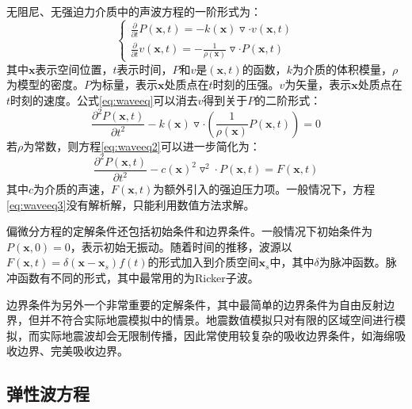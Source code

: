 无阻尼、无强迫力介质中的声波方程的一阶形式为：
\begin{equation}
\left\{\begin{matrix}
\frac{\partial}{\partial t}P(\textbf{x},t) = -k(\textbf{x}) \triangledown \cdot v(\textbf{x}, t) \\
\frac{\partial}{\partial t}v(\textbf{x},t) = -\frac{1}{\rho(\textbf{x})} \triangledown \cdot P(\textbf{x}, t)
\end{matrix}\right.
\label{eq:waveeq}
\end{equation}
其中$\textbf{x}$表示空间位置，$t$表示时间，$P$和$v$是$(\textbf{x},t)$的函数，$k$为介质的体积模量，$\rho$为模型的密度。$P$为标量，表示$\textbf{x}$处质点在$t$时刻的压强。$v$为矢量，表示$\textbf{x}$处质点在$t$时刻的速度。公式\ref{eq:waveeq}可以消去$v$得到关于$P$的二阶形式：
\begin{equation}
  \frac{\partial ^2P(\textbf{x},t)}{\partial t^2} - k(\textbf{x})\triangledown \cdot (\frac{1}{\rho(\textbf{x})}P(\textbf{x},t))=0
  \label{eq:waveeq2}
\end{equation}
若$\rho$为常数，则方程\ref{eq:waveeq2}可以进一步简化为：
\begin{equation}
    \frac{\partial ^2P(\textbf{x},t)}{\partial t^2} - c(\textbf{x})^2\triangledown ^2 \cdot P(\textbf{x},t)=F(\textbf{x}, t)
  \label{eq:waveeq3}
\end{equation}
其中$c$为介质的声速，$F(\textbf{x}, t)$为额外引入的强迫压力项。一般情况下，方程\ref{eq:waveeq3}没有解析解，只能利用数值方法求解。

偏微分方程的定解条件还包括初始条件和边界条件。一般情况下初始条件为$P(\textbf{x},0)=0$，表示初始无振动。随着时间的推移，波源以$F(\textbf{x},t)=\delta(\textbf{x}-\textbf{x}_s)f(t)$的形式加入到介质空间$\textbf{x}_s$中，其中$\delta$为脉冲函数。脉冲函数有不同的形式，其中最常用的为Ricker子波。

边界条件为另外一个非常重要的定解条件，其中最简单的边界条件为自由反射边界，但并不符合实际地震模拟中的情景。地震数值模拟只对有限的区域空间进行模拟，而实际地震波却会无限制传播，因此常使用较复杂的吸收边界条件，如海绵吸收边界\cite{cerjan1985nonreflecting}、完美吸收边界\cite{berenger1994perfectly}。


\subsection{弹性波方程}

